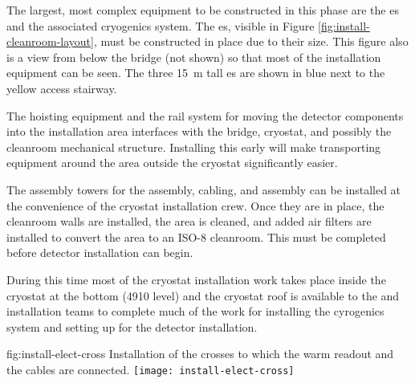 The largest, most complex equipment to be constructed in this phase are the \coldbox{}es and %
the associated cryogenics system. 
The \coldbox{}es, visible in Figure \ref{fig:install-cleanroom-layout}, must be constructed in place due to their size.  
This figure also %
is a view from below the bridge (not shown) so that most of the installation equipment can be seen. 
The three \SI{15}{m} tall  \coldbox{}es are shown in blue next to the yellow access stairway. 

The hoisting equipment and the rail system for moving the detector components into the installation area interfaces with the bridge, cryostat, and possibly the cleanroom mechanical structure. 
Installing this early will make transporting equipment around the area outside the cryostat significantly easier. 
 
The assembly towers for the  assembly,  cabling, and  assembly can be installed at the convenience of the cryostat installation crew. Once they are in place, the cleanroom walls are installed, the area is cleaned, and added air filters are installed to convert the area to an ISO-8 cleanroom. This must be completed before detector installation can begin.

During this time %
most of the cryostat installation work takes place inside the cryostat at the bottom (4910 level) and  %
the cryostat roof is available to the  and  installation teams to complete  
much of the work for installing the cyrogenics system and setting up for the detector installation.  %


\begin{dunefigure}{fig:install-elect-cross}
  {Installation of the crosses to which the  warm readout and the  cables are connected.}
 \texttt{[image: install-elect-cross]}
\end{dunefigure}

